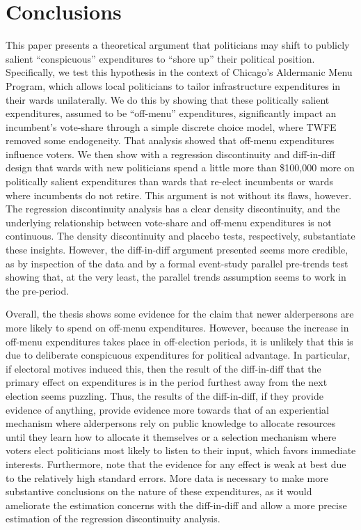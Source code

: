 \section*{Conclusions}

This paper presents a theoretical argument that politicians may shift to publicly salient ``conspicuous'' expenditures to ``shore up'' their political position. 
Specifically, we test this hypothesis in the context of Chicago's Aldermanic Menu Program, which allows local politicians to tailor infrastructure expenditures in their wards unilaterally. 
We do this by showing that these politically salient expenditures, assumed to be ``off-menu'' expenditures, significantly impact an incumbent's vote-share through a simple discrete choice model, where TWFE removed some endogeneity. 
That analysis showed that off-menu expenditures influence voters. 
We then show with a regression discontinuity and diff-in-diff design that wards with new politicians spend a little more than \$100,000 more on politically salient expenditures than wards that re-elect incumbents or wards where incumbents do not retire. 
This argument is not without its flaws, however. 
The regression discontinuity analysis has a clear density discontinuity, and the underlying relationship between vote-share and off-menu expenditures is not continuous. 
The density discontinuity and placebo tests, respectively, substantiate these insights. 
However, the diff-in-diff argument presented seems more credible, as by inspection of the data and by a formal event-study parallel pre-trends test showing that, at the very least, the parallel trends assumption seems to work in the pre-period. 

Overall, the thesis shows some evidence for the claim that newer alderpersons are more likely to spend on off-menu expenditures. 
However, because the increase in off-menu expenditures takes place in off-election periods, it is unlikely that this is due to deliberate conspicuous expenditures for political advantage. 
In particular, if electoral motives induced this, then the result of the diff-in-diff that the primary effect on expenditures is in the period furthest away from the next election seems puzzling. 
Thus, the results of the diff-in-diff, if they provide evidence of anything, provide evidence more towards that of an experiential mechanism where alderpersons rely on public knowledge to allocate resources until they learn how to allocate it themselves or a selection mechanism where voters elect politicians most likely to listen to their input, which favors immediate interests. 
Furthermore, note that the evidence for any effect is weak at best due to the relatively high standard errors. 
More data is necessary to make more substantive conclusions on the nature of these expenditures, as it would ameliorate the estimation concerns with the diff-in-diff and allow a more precise estimation of the regression discontinuity analysis.